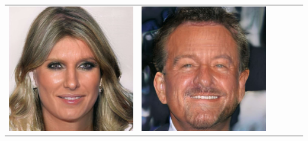 \documentclass[a0,landscape]{a0poster}
\begin{document}
\begin{multicols}{3}
\begin{center}
\begin{tabular}{cc|cc|cc}
\includegraphics[width=\pganw]{../figures/pgan/58_base_iso_base.jpg} &
\includegraphics[width=\pganw]{../figures/pgan/59_base_iso_base.jpg} &

\end{tabular}
\end{center}
\end{multicols}
\end{document}
